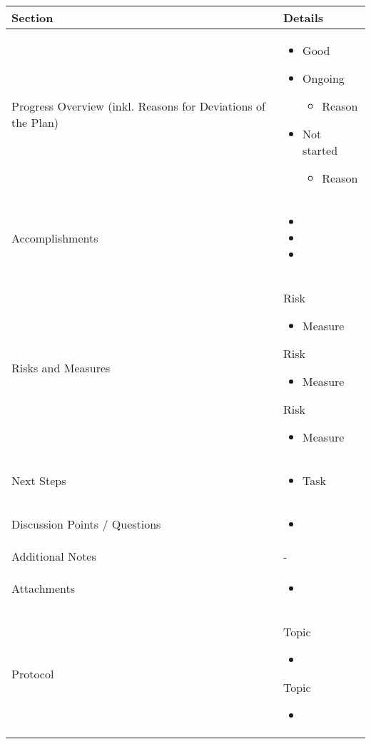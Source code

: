 \documentclass[a4paper,11pt]{article}
\newcommand{\done}{\textcolor{green}{\ding{52}}}
\newcommand{\ongoing}{\textcolor{orange}{\ding{45}}}
\newcommand{\notstarted}{\textcolor{red}{\ding{56}}}
\begin{document}
	
	\renewcommand{\arraystretch}{1.5}
	\begin{longtable}{|p{3.5cm}|p{12cm}|}
		\hline
		\textbf{Section} & \textbf{Details} \\
		\hline
		Progress Overview (inkl. Reasons for Deviations of the Plan) & \begin{itemize}
			\item[\done] Good
			\item[\ongoing] Ongoing
			\begin{itemize}
				\item Reason
			\end{itemize}
			\item[\notstarted] Not started
			\begin{itemize}
				\item Reason
			\end{itemize}
		\end{itemize} \\
		\hline
		Accomplishments & \begin{itemize}
			\item[\done] 
			\item[\done] 
			\item[\done] 
		\end{itemize} \\
		\hline
		Risks and Measures & 
		Risk
		\begin{itemize}
			\item Measure
		\end{itemize}
		
	    Risk
		\begin{itemize}
			\item Measure
		\end{itemize}
		
		Risk
		\begin{itemize}
			\item Measure
		\end{itemize} \\
		
		\hline
		Next Steps & \begin{itemize}
			\item Task
		\end{itemize} \\
		\hline
		Discussion Points / Questions & \begin{itemize}
			\item 
		\end{itemize} \\
		\hline
		Additional Notes & - \\
		\hline
		Attachments  & \begin{itemize}
			\item 
		\end{itemize} \\
		\hline
		Protocol  & 
		Topic
		\begin{itemize}
			\item 
		\end{itemize}
		
		Topic
		\begin{itemize}
			\item 
		\end{itemize} \\
		\hline
	\end{longtable}
	
\end{document}
